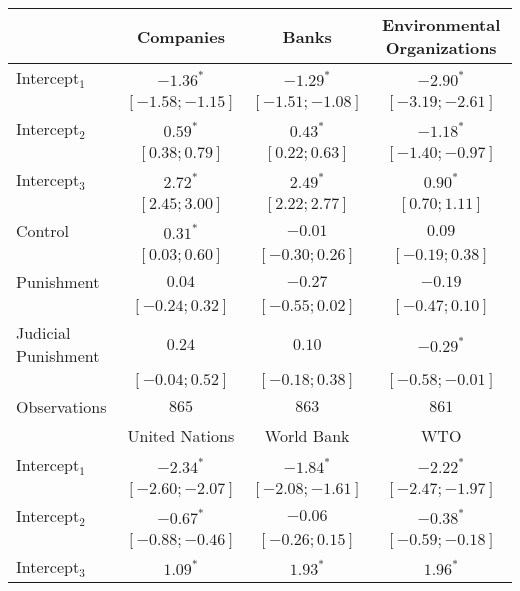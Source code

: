 \begin{table}[h]
\begin{center}
\begin{threeparttable}
\begin{tabular}{l c c c}
\hline
 & Companies & Banks & Environmental
Organizations \\
\hline
Intercept$_1$       & $-1.36^{*}$       & $-1.29^{*}$       & $-2.90^{*}$       \\
                    & $ [-1.58; -1.15]$ & $ [-1.51; -1.08]$ & $ [-3.19; -2.61]$ \\
Intercept$_2$       & $0.59^{*}$        & $0.43^{*}$        & $-1.18^{*}$       \\
                    & $ [ 0.38;  0.79]$ & $ [ 0.22;  0.63]$ & $ [-1.40; -0.97]$ \\
Intercept$_3$       & $2.72^{*}$        & $2.49^{*}$        & $0.90^{*}$        \\
                    & $ [ 2.45;  3.00]$ & $ [ 2.22;  2.77]$ & $ [ 0.70;  1.11]$ \\
Control             & $0.31^{*}$        & $-0.01$           & $0.09$            \\
                    & $ [ 0.03;  0.60]$ & $ [-0.30;  0.26]$ & $ [-0.19;  0.38]$ \\
Punishment          & $0.04$            & $-0.27$           & $-0.19$           \\
                    & $ [-0.24;  0.32]$ & $ [-0.55;  0.02]$ & $ [-0.47;  0.10]$ \\
Judicial Punishment & $0.24$            & $0.10$            & $-0.29^{*}$       \\
                    & $ [-0.04;  0.52]$ & $ [-0.18;  0.38]$ & $ [-0.58; -0.01]$ \\
\hline
Observations        & $865$             & $863$             & $861$             \\
\hline
 & United Nations & World Bank & WTO \\
\hline
Intercept$_1$       & $-2.34^{*}$       & $-1.84^{*}$       & $-2.22^{*}$       \\
                    & $ [-2.60; -2.07]$ & $ [-2.08; -1.61]$ & $ [-2.47; -1.97]$ \\
Intercept$_2$       & $-0.67^{*}$       & $-0.06$           & $-0.38^{*}$       \\
                    & $ [-0.88; -0.46]$ & $ [-0.26;  0.15]$ & $ [-0.59; -0.18]$ \\
Intercept$_3$       & $1.09^{*}$        & $1.93^{*}$        & $1.96^{*}$        \\

\end{tabular}
\end{threeparttable}
\end{center}
\end{table}

